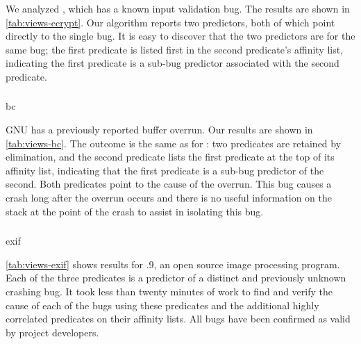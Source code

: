 We analyzed , which has a known input validation bug.  The
results are shown in \autoref{tab:views-ccrypt}.  Our algorithm
reports two predictors, both of which point directly to the single bug.
It is easy to discover that the two predictors are for the same bug;
the first predicate is listed first in the second predicate's affinity
list, indicating the first predicate is a sub-bug predictor associated
with the second predicate.

\subsubsection{\bc}

\begin{view}{\bc}{bc}
  
\end{view}

GNU  has a previously reported buffer overrun.  Our results
are shown in \autoref{tab:views-bc}.  The outcome is the same as for
\ccrypt: two predicates are retained by elimination, and the second
predicate lists the first predicate at the top of its affinity list,
indicating that the first predicate is a sub-bug predictor of the second.
Both predicates point to the cause of the overrun.  This bug causes a
crash long after the overrun occurs and there is no useful information
on the stack at the point of the crash to assist in isolating this
bug.

\subsubsection{\exif}

\begin{view}{\exif}{exif}
  
\end{view}

\autoref{tab:views-exif} shows results for .9, an open source
image processing program.  Each of the three predicates is a predictor
of a distinct and previously unknown crashing bug.  It took less than
twenty minutes of work to find and verify the cause of each of the bugs
using these predicates and the additional highly correlated predicates
on their affinity lists.  All bugs have been confirmed as valid by
\exif project developers.

